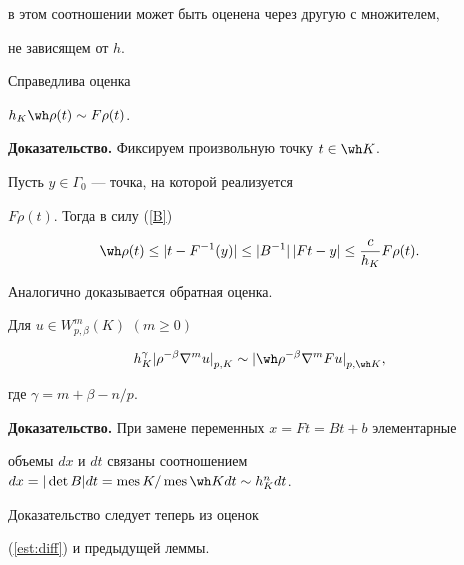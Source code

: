 в этом соотношении может быть оценена через другую с множителем, 


не зависящем от $h$.





\begin{lem} \label{rho} Справедлива оценка 


$h_K \wh \rho(t) \sim F\rho(t)$.


\end{lem}





{\bf Доказательство.} Фиксируем произвольную точку $t \in \wh K$. 


Пусть $y \in \Gamma_0$ --- точка, на которой реализуется 


$F\rho(t)$. Тогда в силу (\ref{B})


$$


\wh \rho(t) \le |t-F^{-1}(y)| \le |B^{-1}|\, |Ft-y|


\le \frac{c}{h_K} F\rho(t).


$$


Аналогично доказывается обратная оценка. 





\begin{lem} \label{seminorm}


Для $u \in W^m_{p,\beta}(K)$ $(m \ge 0)$ 


$$


h_K^\gamma {|\rho^{-\beta}\nabla^mu|}_{p,K} 


\sim {|\wh \rho^{-\beta}\nabla^mFu|}_{p,\wh K},


$$


где $\gamma=m+\beta-n/p$.


\end{lem}





{\bf Доказательство.} При замене переменных $x=Ft=Bt+b$ элементарные 


объемы $dx$ и $dt$ связаны соотношением $dx=|\det B|dt=


\mes K / \mes\wh K dt \sim h^n_K dt$. 


Доказательство следует теперь из оценок 


(\ref{est:diff}) и предыдущей леммы.


\medskip





